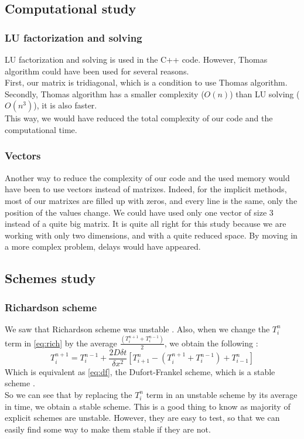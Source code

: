 \documentclass{article}
\begin{document}
        \subsection{Computational study}
            \subsubsection{LU factorization and solving}
                LU factorization and solving is used in the C++ code. However, Thomas algorithm could have been used for several 
                reasons.
                \\
                First, our matrix is tridiagonal, which is a condition to use Thomas algorithm.
                \\
                Secondly, Thomas algorithm has a smaller complexity ($O(n)$) than LU solving ($O(n^3)$), it is also faster.
                \\
                This way, we would have reduced the total complexity of our code and the computational time.
            \subsubsection{Vectors}
                Another way to reduce the complexity of our code and the used memory would have been to use vectors instead
                of matrixes. Indeed, for the implicit methods, most of our matrixes are filled up with zeros, and every line is
                the same, only the position of the values change. We could have used only one vector of size 3 instead of a quite big matrix.
                It is quite all right for this study because we are working with only two dimensions, and with a quite reduced space.
                By moving in a more complex problem, delays would have appeared.
        \subsection{Schemes study}
            \subsubsection{Richardson scheme}
                We saw that Richardson scheme was unstable \cite{rich}. Also, when we change the $T_{i}^n$ term
                in \eqref{eq:rich} by the average $\frac{(T_i^{n+1}+T_i^{n-1})}{2}$, we obtain the following :
                \begin{equation}
                    T_i^{n+1} = T_i^{n-1} + \frac{2D\delta t}{\delta x^2}[T_{i+1}^n - (T_i^{n+1}+T_i^{n-1}) + T_{i-1}^n]
                \end{equation}
                Which is equivalent as \eqref{eq:df}, the Dufort-Frankel scheme, which is a stable scheme \cite{df}.
                \\
                So we can see that by replacing the $T_{i}^n$ term in an unstable scheme by its average in time, we obtain 
                a stable scheme. This is a good thing to know as majority of explicit schemes are unstable. However, they are
                easy to test, so that we can easily find some way to make them stable if they are not.
\end{document}
